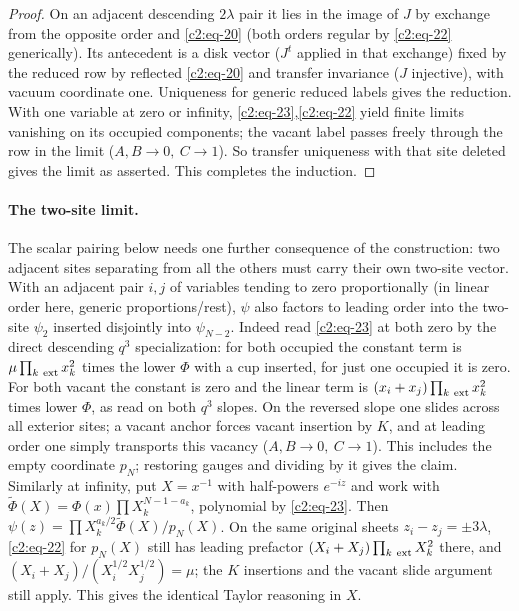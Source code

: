 \begin{proof}
On an adjacent descending \(2\lambda\) pair it lies in the image of \(J\) by exchange from the opposite order and \eqref{c2:eq-20} (both orders regular by \eqref{c2:eq-22} generically). Its antecedent is a disk vector (\(J^t\) applied in that exchange) fixed by the reduced row by reflected \eqref{c2:eq-20} and transfer invariance (\(J\) injective), with vacuum coordinate one. Uniqueness for generic reduced labels gives the reduction. With one variable at zero or infinity, \eqref{c2:eq-23},\eqref{c2:eq-22} yield finite limits vanishing on its occupied components; the vacant label passes freely through the row in the limit (\(A,B\to0,\ C\to1\)). So transfer uniqueness with that site deleted gives the limit as asserted. This completes the induction.
\end{proof}

\paragraph{The two-site limit.}
The scalar pairing below needs one further consequence of the construction:
two adjacent sites separating from all the others must carry their own
two-site vector.
With an adjacent pair \(i,j\) of variables tending to zero proportionally (in linear order here, generic proportions/rest), \(\psi\) also factors to leading order into the two-site \(\psi_2\) inserted disjointly into \(\psi_{N-2}\). Indeed read \eqref{c2:eq-23} at both zero by the direct descending \(q^3\) specialization: for both occupied the constant term is \(\mu\prod_{k\ {\rm ext}}x_k^2\) times the lower \(\Phi\) with a cup inserted, for just one occupied it is zero. For both vacant the constant is zero and the linear term is \((x_i+x_j)\prod_{k\ {\rm ext}}x_k^2\) times lower \(\Phi\), as read on both \(q^3\) slopes. On the reversed slope one slides across all exterior sites; a vacant anchor forces vacant insertion by \(K\), and at leading order one simply transports this vacancy (\(A,B\to0,\ C\to1\)). This includes the empty coordinate \(p_N\); restoring gauges and dividing by it gives the claim. Similarly at infinity, put \(X=x^{-1}\) with half-powers \(e^{-iz}\) and work with \(\widetilde\Phi(X)=\Phi(x)\prod X_k^{N-1-a_k}\), polynomial by \eqref{c2:eq-23}. Then \(\psi(z)=\prod X_k^{a_k/2}\widetilde\Phi(X)/p_N(X)\). On the same original sheets \(z_i-z_j=\pm3\lambda\), \eqref{c2:eq-22} for \(p_N(X)\) still has leading prefactor \((X_i+X_j)\prod_{k\ {\rm ext}}X_k^2\) there, and \((X_i+X_j)/(X_i^{1/2}X_j^{1/2})=\mu\); the \(K\) insertions and the vacant slide argument still apply. This gives the identical Taylor reasoning in \(X\).


